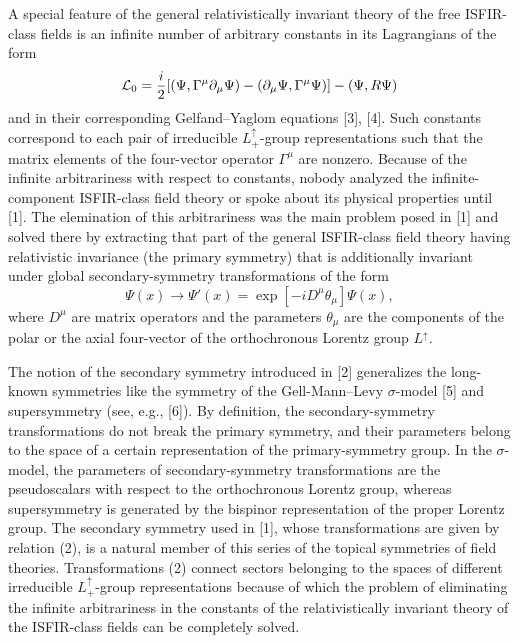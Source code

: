 \documentclass[a4paper,12pt]{article}
\begin{document}
A special feature of the general relativistically invariant theory of the free
ISFIR-class fields is an infinite number of arbitrary constants in its
Lagrangians of the form
\begin{equation}
{\cal L}_{0} = \frac{i}{2}[(\Psi, \Gamma^{\mu} \partial_{\mu} \Psi ) - 
(\partial_{\mu} \Psi, \Gamma^{\mu} \Psi )] - (\Psi, R\Psi )
\end{equation}
and in their corresponding Gelfand--Yaglom equations [3], [4]. Such constants
correspond to each pair of irreducible $L^{\uparrow}_{+}$-group representations
such that the matrix elements of the four-vector operator $\Gamma^{\mu}$ are
nonzero. Because of the infinite arbitrariness with respect to constants,
nobody analyzed the infinite-component ISFIR-class field theory or spoke about
its physical properties until [1]. The elemination of this arbitrariness was 
the main problem posed in [1] and solved there by extracting that part of the
general ISFIR-class field theory having relativistic invariance (the primary
symmetry) that is additionally invariant under global secondary-symmetry
transformations of the form
\begin{equation}
\Psi (x) \rightarrow \Psi '(x) = \exp [-i D^{\mu} \theta_{\mu}] \Psi (x),
\end{equation}
where $D^{\mu}$ are matrix operators and the parameters $\theta_{\mu}$ are the
components of the polar or the axial four-vector of the orthochronous Lorentz
group $L^{\uparrow}$.

The notion of the secondary symmetry introduced in [2] generalizes the
long-known symmetries like the symmetry of the Gell-Mann--Levy $\sigma$-model
[5] and supersymmetry (see, e.g., [6]). By definition, the secondary-symmetry
transformations do not break the primary symmetry, and their parameters belong
to the space of a certain representation of the primary-symmetry group. In the
$\sigma$-model, the parameters of secondary-symmetry transformations are the
pseudoscalars with respect to the orthochronous Lorentz group, whereas
supersymmetry is generated by the bispinor representation of the proper 
Lorentz group. The secondary symmetry used in [1], whose transformations are
given by relation (2), is a natural member of this series of the topical
symmetries of field theories. Transformations (2) connect sectors belonging to
the spaces of different irreducible $L^{\uparrow}_{+}$-group representations 
because of which the problem of eliminating the infinite arbitrariness in the
constants of the relativistically invariant theory of the ISFIR-class fields
can be completely solved.
\end{document}
